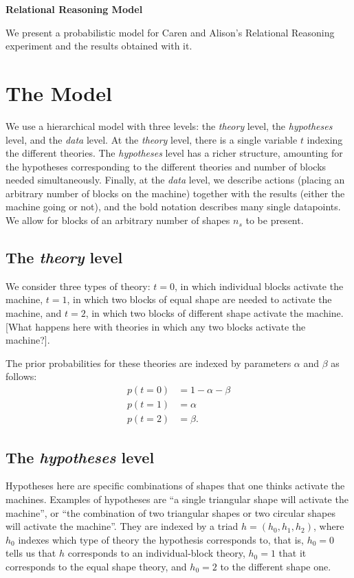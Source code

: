 \documentclass[11pt, a4paper]{article}
\begin{document}
\begin{center}
{\noindent \huge \bf Relational Reasoning Model }\\
\end{center}

We present a probabilistic model for Caren and Alison's Relational Reasoning experiment and the results obtained with it.

\section*{The Model}
We use a hierarchical model with three levels: the \emph{theory} level, the \emph{hypotheses} level, and the \emph{data} level. At the \emph{theory} level, there is a single variable $t$ indexing the different theories. The \emph{hypotheses} level has a richer structure, amounting for the hypotheses corresponding to the different theories and number of blocks needed simultaneously. Finally, at the \emph{data} level, we describe actions (placing an arbitrary number of blocks on the machine) together with the results (either the machine going or not), and the bold notation describes many single datapoints. We allow for blocks of an arbitrary number of shapes $n_s$ to be present.


\subsection*{The \emph{theory} level}
We consider three types of theory: $t=0$, in which individual blocks activate the machine, $t=1$, in which two blocks of equal shape are needed to activate the machine, and $t=2$, in which two blocks of different shape activate the machine. [What happens here with theories in which any two blocks activate the machine?].

The prior probabilities for these theories are indexed by parameters $\alpha$ and $\beta$ as follows:
\begin{equation}
\begin{split}
p(t=0)&=1-\alpha-\beta\\
p(t=1)&=\alpha\\
p(t=2)&=\beta.
\end{split} 
\end{equation}

\subsection*{The \emph{hypotheses} level}
Hypotheses here are specific combinations of shapes that one thinks activate the machines. Examples of hypotheses are ``a single triangular shape will activate the machine'', or ``the combination of two triangular shapes or two circular shapes will activate the machine''. They are indexed by a triad $h=(h_0,h_1,h_2)$, where $h_0$ indexes which type of theory the hypothesis corresponds to, that is, $h_0=0$ tells us that $h$ corresponds to an individual-block theory, $h_0=1$ that it corresponds to the equal shape theory, and $h_0=2$ to the different shape one.
\end{document}
